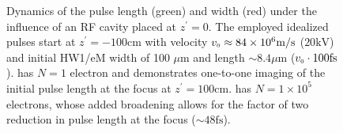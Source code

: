 \begin{figure}
  \centerline {
    \subfloat[][]{
      \label{fig:rf_cav_N1}
      \begin{tikzpicture}
        
      \end{tikzpicture}
    }
    \subfloat[][]{
      \label{fig:rf_cav_N1e5}
      \begin{tikzpicture}
        
      \end{tikzpicture}
    }
  }
  \caption[Dynamics of the pulse length and width under the influence of an RF cavity]{
    Dynamics of the pulse length (green) and width (red) under the influence of an RF cavity placed at $z^{\prime} = 0$.
    The employed idealized pulses start at $z^{\prime} = -100\text{cm}$ with velocity $v_{{\scriptscriptstyle 0}} \approx 84 \times 10^{6} \text{m/s}$ ($20\text{kV}$) and initial HW1/eM width of 100 $\mu$m and length $\sim 8.4 \mu\text{m}$ ($v_{{\scriptscriptstyle 0}} \cdot 100\text{fs}$).
     has $N=1$ electron and demonstrates one-to-one imaging of the initial pulse length at the focus at $ z^{\prime} = 100 \text{cm}$.
     has $ N = 1 \times 10^5 $ electrons, whose added broadening allows for the factor of two reduction in pulse length at the focus ($\sim 48\text{fs}$).
  }
  \label{fig:rf_cav_num}
\end{figure}
